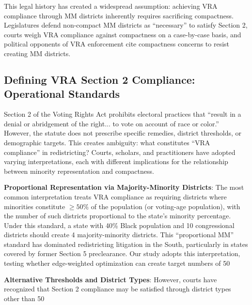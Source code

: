 This legal history has created a widespread assumption: achieving VRA compliance through MM districts inherently requires sacrificing compactness. Legislatures defend non-compact MM districts as ``necessary'' to satisfy Section 2, courts weigh VRA compliance against compactness on a case-by-case basis, and political opponents of VRA enforcement cite compactness concerns to resist creating MM districts.

\subsection{Defining VRA Section 2 Compliance: Operational Standards}

Section 2 of the Voting Rights Act prohibits electoral practices that ``result in a denial or abridgement of the right... to vote on account of race or color.'' However, the statute does not prescribe specific remedies, district thresholds, or demographic targets. This creates ambiguity: what constitutes ``VRA compliance'' in redistricting? Courts, scholars, and practitioners have adopted varying interpretations, each with different implications for the relationship between minority representation and compactness.

\textbf{Proportional Representation via Majority-Minority Districts}: The most common interpretation treats VRA compliance as requiring districts where minorities constitute $\geq 50\%$ of the population (or voting-age population), with the number of such districts proportional to the state's minority percentage. Under this standard, a state with 40\% Black population and 10 congressional districts should create 4 majority-minority districts. This ``proportional MM'' standard has dominated redistricting litigation in the South, particularly in states covered by former Section 5 preclearance. Our study adopts this interpretation, testing whether edge-weighted optimization can create target numbers of 50%

\textbf{Alternative Thresholds and District Types}: However, courts have recognized that Section 2 compliance may be satisfied through district types other than 50%

